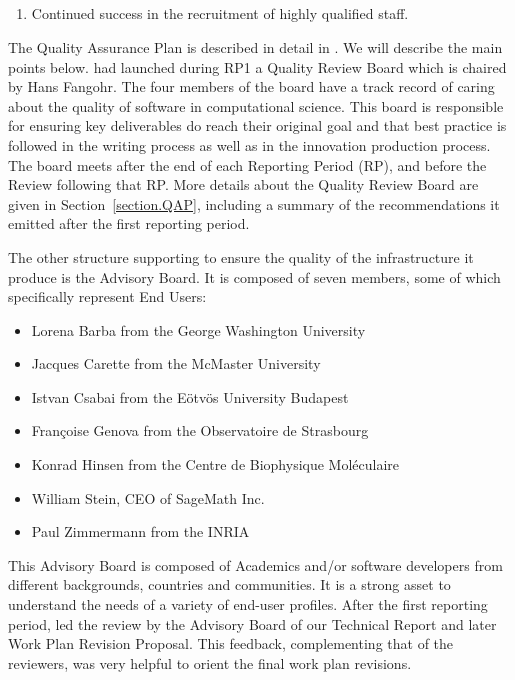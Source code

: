 \subparagraph{}


\begin{enumerate}
\item Continued success in the recruitment of highly qualified staff.
\end{enumerate}

The Quality Assurance Plan is described in detail in
. We will describe the main points
below.  had launched during RP1 a Quality Review Board which
is chaired by Hans Fangohr. The four members of the board have a track
record of caring about the quality of software in computational
science. This board is responsible for ensuring key deliverables do
reach their original goal and that best practice is followed in the
writing process as well as in the innovation production process. The
board meets after the end of each Reporting Period (RP), and before
the Review following that RP. More details about the Quality Review
Board are given in Section~\ref{section.QAP}, including a summary of
the recommendations it emitted after the first reporting period.



The other structure supporting \ODK to ensure the quality of the
infrastructure it produce is the Advisory Board. It is composed of
seven members, some of which specifically represent End Users:

\begin{itemize}
\item{Lorena Barba from the George Washington University}
\item{Jacques Carette from the McMaster University}
\item{Istvan Csabai from the Eötvös University Budapest}
\item{Françoise Genova from the Observatoire de Strasbourg}
\item{Konrad Hinsen from the Centre de Biophysique Moléculaire}
\item{William Stein, CEO of SageMath Inc.}
\item{Paul Zimmermann from the INRIA}
\end{itemize}

This Advisory Board is composed of Academics and/or software
developers from different backgrounds, countries and communities. It
is a strong asset to understand the needs of a variety of end-user
profiles. After the first reporting period,  led the review
by the Advisory Board of our Technical Report and later Work Plan
Revision Proposal. This feedback, complementing that of the reviewers,
was very helpful to orient the final work plan revisions.

